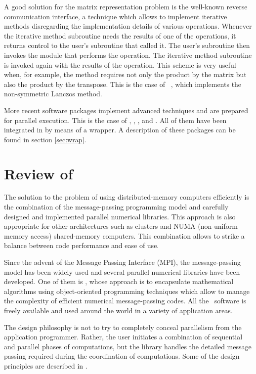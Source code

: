 	A good solution for the matrix representation problem is the well-known reverse communication interface, a technique which allows to implement iterative methods disregarding the implementation details of various operations. Whenever the iterative method subroutine needs the results of one of the operations, it returns control to the user's subroutine that called it. The user's subroutine then invokes the module that performs the operation. The iterative method subroutine is invoked again with the results of the operation. This scheme is very useful when, for example, the method requires not only the product by the matrix but also the product by the transpose. This is the case of \qmrpack\ \citep{Freund:1996:QPQ}, which implements the non-symmetric Lanczos method. 
	
	More recent software packages implement advanced techniques and are prepared for parallel execution. This is the case of \arpack, \blzpack, \planso, and \trlan. All of them have been integrated in \slepc by means of a wrapper. A description of these packages can be found in section \ref{sec:wrap}.

\section{Review of \petsc}
\label{sec:petsc}

	The solution to the problem of using distributed-memory computers efficiently is the combination of the message-passing programming model and carefully designed and implemented parallel numerical libraries. This approach is also appropriate for other architectures such as clusters and NUMA (non-uniform memory access) shared-memory computers. This combination allows to strike a balance between code performance and ease of use.

	Since the advent of the Message Passing Interface (MPI), the message-passing model has been widely used and several parallel numerical libraries have been developed. One of them is \petsc{} \citep{Balay:2002:PUM}, whose approach is to encapsulate mathematical algorithms using object-oriented programming techniques which allow to manage the complexity of efficient numerical message-passing codes. All the \petsc\ software is freely available and used around the world in a variety of application areas.

	The design philosophy is not to try to completely conceal parallelism from the application programmer. Rather, the user initiates a combination of sequential and parallel phases of computations, but the library handles the detailed message passing required during the coordination of computations. Some of the design principles are described in \citep{Balay:1997:EMP}.

